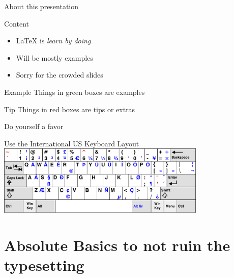 \documentclass[xetex, onlymath, handout]{beamer}
\begin{document}
\begin{frame}{About this presentation}
\begin{block}{Content}
\begin{itemize}
  \item \textrm{\LaTeX} is \emph{learn by doing} \\
  \item Will be mostly examples
  \item Sorry for the crowded slides
\end{itemize}
\end{block}

\begin{exampleblock}{Example}
Things in green boxes are examples
\end{exampleblock}

\begin{alertblock}{Tip}
Things in red boxes are tips or extras
\end{alertblock}
\end{frame}

\begin{frame}{Do yourself a favor}
  \begin{alertblock}{Use the International US Keyboard Layout}
    \centering
    \vspace{3pt}
    \includegraphics[height=9em]{figs/kbd-us-intl}
  \end{alertblock}
\end{frame}

\section{Absolute Basics to not ruin the typesetting}
\end{document}
